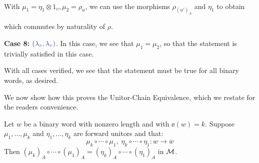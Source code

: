 \begin{prf}
\\
With $\mu_1 = \eta_1\otimes 1_v, \mu_2 = \rho_u$, we can use the morphisms 
$\rho_{(u')_A}$ and $\eta_1$ to obtain 
\begin{center}
\end{center}
which commutes by naturality of $\rho$. 

\textbf{Case 8:} $\textcolor{Blue}{(\lambda_v, \lambda_v)}$. 
In this case, we see that $\mu_1 = \mu_2$, so that the statement is trivially 
satisfied in this case. 

With all cases verified, we see that the statement must be true for all 
binary words, as desired. 
\end{prf}

We now show how this proves the Unitor-Chain Equivalence, which we restate 
for the readers convenience. 

\begin{proposition}\label{proposition:unitor_chain_equivalence}
    Let $w$ be a binary word with nonzero length and with $\ee(w) = k$. 
    Suppose $\mu_1, \dots, \mu_k$ and $\eta_1, \dots, \eta_k$ are forward 
    unitors and that:
    \[
        \mu_k \circ \cdots \circ \mu_1, \; \eta_k \circ \cdots \circ \eta_1: w \to \overline{w}
    \]
    Then $(\mu_k)_A \circ \cdots \circ (\mu_1)_A =  (\eta_k)_A \circ \cdots \circ (\eta_1)_A$
    in $\mathcal{M}$.
\end{proposition}

